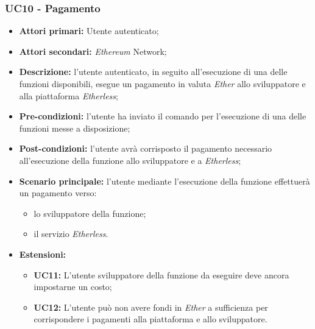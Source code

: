 \subsubsection{UC10 - Pagamento}
\begin{itemize}
	\item \textbf{Attori primari:} Utente autenticato;
	\item \textbf{Attori secondari:} \textit{Ethereum\glo} Network;
	\item \textbf{Descrizione:} l'utente autenticato, in seguito all'esecuzione di una delle funzioni disponibili, esegue un pagamento in valuta \textit{Ether\glo} allo sviluppatore e alla piattaforma \textit{Etherless}; 
	\item \textbf{Pre-condizioni:} l'utente ha inviato il comando per l'esecuzione di una delle funzioni messe a disposizione;
	\item \textbf{Post-condizioni:} l'utente avrà corrisposto il pagamento necessario all'esecuzione della funzione allo sviluppatore e a \textit{Etherless};
	\item \textbf{Scenario principale:} l'utente mediante l'esecuzione della funzione effettuerà un pagamento verso:
	\begin{itemize}
		\item lo sviluppatore della funzione;
		\item il servizio \textit{Etherless}.
	\end{itemize}
	\item \textbf{Estensioni:} 
	\begin{itemize}
		\item \textbf{UC11:} L'utente sviluppatore della funzione da eseguire deve ancora impostarne un costo;
		\item \textbf{UC12:} L'utente può non avere fondi in \textit{Ether\glo} a sufficienza per corrispondere i pagamenti alla piattaforma e allo sviluppatore.
	\end{itemize}
\end{itemize}